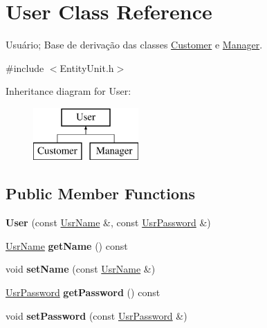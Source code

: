 \hypertarget{classUser}{\section{User Class Reference}
\label{classUser}
}


Usuário; Base de derivação das classes \hyperlink{classCustomer}{Customer} e \hyperlink{classManager}{Manager}.  




{\ttfamily \#include $<$Entity\-Unit.\-h$>$}

Inheritance diagram for User\-:\begin{figure}[H]
\begin{center}
\leavevmode
\includegraphics[height=2.000000cm]{classUser}
\end{center}
\end{figure}
\subsection*{Public Member Functions}
\begin{DoxyCompactItemize}
\item 
\hypertarget{classUser_a550edb2b7dae1148df00157962f4cbce}{{\bfseries User} (const \hyperlink{classUsrName}{Usr\-Name} \&, const \hyperlink{classUsrPassword}{Usr\-Password} \&)}\label{classUser_a550edb2b7dae1148df00157962f4cbce}

\item 
\hypertarget{classUser_ae1dd9bb1a02ea1aa4246da19c28cd831}{\hyperlink{classUsrName}{Usr\-Name} {\bfseries get\-Name} () const }\label{classUser_ae1dd9bb1a02ea1aa4246da19c28cd831}

\item 
\hypertarget{classUser_a3a25b1b158ff07d1349d1d3019c7c0c0}{void {\bfseries set\-Name} (const \hyperlink{classUsrName}{Usr\-Name} \&)}\label{classUser_a3a25b1b158ff07d1349d1d3019c7c0c0}

\item 
\hypertarget{classUser_a799c61fc6ff206a1b1edbc86d61989ed}{\hyperlink{classUsrPassword}{Usr\-Password} {\bfseries get\-Password} () const }\label{classUser_a799c61fc6ff206a1b1edbc86d61989ed}

\item 
\hypertarget{classUser_a524865340fb55a6bdc983143cc82fd5d}{void {\bfseries set\-Password} (const \hyperlink{classUsrPassword}{Usr\-Password} \&)}\label{classUser_a524865340fb55a6bdc983143cc82fd5d}

\end{DoxyCompactItemize}


